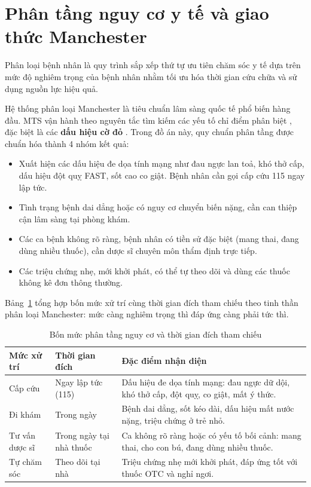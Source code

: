 \section{Phân tầng nguy cơ y tế và giao thức Manchester}

Phân loại bệnh nhân  là quy trình sắp xếp thứ tự ưu tiên
chăm sóc y tế dựa trên mức độ nghiêm trọng của bệnh nhân nhằm tối ưu hóa thời
gian cứu chữa và sử dụng nguồn lực hiệu quả.

Hệ thống phân loại Manchester 
\cite{Mackway2014} là tiêu chuẩn lâm sàng quốc tế phổ biến hàng đầu. MTS vận
hành theo nguyên tắc tìm kiếm các yếu tố chỉ điểm phân biệt ,
đặc biệt là các \textbf{dấu hiệu cờ đỏ }. Trong đồ án này, quy
chuẩn phân tầng được chuẩn hóa thành 4 nhóm kết quả:
\begin{itemize}[leftmargin=1.6em, itemsep=2pt]
  \item {} Xuất hiện các dấu hiệu đe dọa tính mạng
        như đau ngực lan toả, khó thở cấp, dấu hiệu đột quỵ FAST, sốt cao co
        giật. Bệnh nhân cần gọi cấp cứu 115 ngay lập tức.
  \item {} Tình trạng bệnh dai dẳng hoặc có
        nguy cơ chuyển biến nặng, cần can thiệp cận lâm sàng tại phòng khám.
  \item {} Các ca bệnh không rõ ràng,
        bệnh nhân có tiền sử đặc biệt (mang thai, đang dùng nhiều thuốc), cần
        dược sĩ chuyên môn thẩm định trực tiếp.
  \item {} Các triệu chứng nhẹ, mới khởi phát,
        có thể tự theo dõi và dùng các thuốc không kê đơn  thông thường.
\end{itemize}

Bảng~\ref{tab:manchester} tổng hợp bốn mức xử trí cùng thời gian đích tham
chiếu theo tinh thần phân loại Manchester: mức càng nghiêm trọng thì đáp ứng
càng phải tức thì.

\begin{table}[H]
\centering
\caption{Bốn mức phân tầng nguy cơ và thời gian đích tham chiếu}
\label{tab:manchester}
\small
\begin{tabular}{|l|l|p{5.6cm}|}
\toprule
\textbf{Mức xử trí} & \textbf{Thời gian đích} & \textbf{Đặc điểm nhận diện} \\
\midrule
Cấp cứu & Ngay lập tức (115) & Dấu hiệu đe dọa tính mạng: đau ngực dữ dội,
khó thở cấp, đột quỵ, co giật, mất ý thức. \\
Đi khám & Trong ngày & Bệnh dai dẳng, sốt kéo dài, dấu hiệu mất nước nặng,
triệu chứng ở trẻ nhỏ. \\
Tư vấn dược sĩ & Trong ngày tại nhà thuốc & Ca không rõ ràng hoặc có yếu tố
bối cảnh: mang thai, cho con bú, đang dùng nhiều thuốc. \\
Tự chăm sóc & Theo dõi tại nhà & Triệu chứng nhẹ mới khởi phát, đáp ứng tốt
với thuốc OTC và nghỉ ngơi. \\
\bottomrule
\end{tabular}
\end{table}

